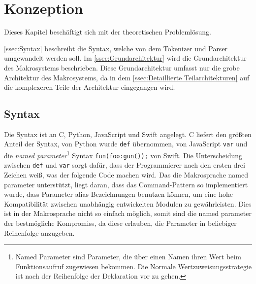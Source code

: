 \section{Konzeption}
\label{sec:Konzeption}
  Dieses Kapitel beschäftigt sich mit der theoretischen Problemlösung.

  \autoref{ssec:Syntax} beschreibt die Syntax, welche von dem Tokenizer und Parser umgewandelt werden soll. Im \autoref{ssec:Grundarchitektur} wird die Grundarchitektur des Makrosystems beschrieben. Diese Grundarchitektur umfasst nur die grobe Architektur des Makrosystems, da in dem \autoref{ssec:Detaillierte Teilarchitekturen} auf die komplexeren Teile der Architektur eingegangen wird.

  \subsection{Syntax}
  \label{ssec:Syntax}
    Die Syntax ist an C\autocite{C-std}, Python\autocite{Python-std}, JavaScript \autocite{Ecma-std} und Swift\autocite{Swift-std} angelegt. C liefert den größten Anteil der Syntax, von Python wurde \lstinline[style=MyMacroStyleIn]$def$ übernommen, von JavaScript \lstinline[style=MyMacroStyleIn]$var$ und die \emph{named parameter}\footnote{
      Named Parameter sind Parameter, die über einen Namen ihren Wert beim Funktionsaufruf zugewiesen bekommen. Die Normale Wertzuweisungsstrategie ist nach der Reihenfolge der Deklaration vor zu gehen.
    }
    Syntax \lstinline[style=MyMacroStyleIn]$fun(foo:gun());$ von Swift. Die Unterscheidung zwischen \lstinline[style=MyMacroStyleIn]$def$ und \lstinline[style=MyMacroStyleIn]$var$ sorgt dafür, dass der Programmierer nach den ersten drei Zeichen weiß, was der folgende Code machen wird. Das die Makrosprache named parameter unterstützt, liegt daran, dass das
    Command-Pattern %
    so implementiert wurde, dass Parameter alias Bezeichnungen benutzen können, um eine hohe Kompatibilität zwischen unabhängig entwickelten Modulen zu gewährleisten. Dies ist in der Makrosprache nicht so einfach möglich, somit sind die named parameter der bestmögliche Kompromiss, da diese erlauben, die Parameter in beliebiger Reihenfolge anzugeben.

